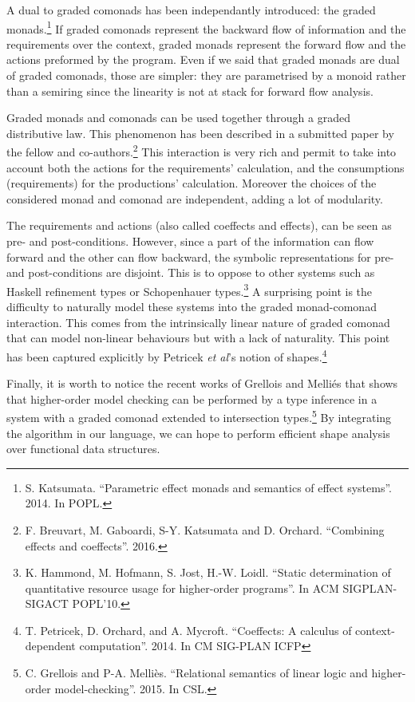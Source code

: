 \documentclass{article}[11pt]
\begin{document}
A dual to graded comonads has been independantly introduced: the graded monads.\footnote{S. Katsumata. ``Parametric effect monads and semantics of effect systems''. 2014. In POPL.} If graded comonads represent the backward flow of information and the requirements over the context, graded monads represent the forward flow and the actions preformed by the program. Even if we said that graded monads are dual of graded comonads, those are simpler: they are parametrised by a monoid rather than a semiring since the linearity is not at stack for forward flow analysis.

Graded monads and comonads can be used together through a graded distributive law. This phenomenon has been described in a submitted paper by the fellow and co-authors.\footnote{F. Breuvart, M. Gaboardi, S-Y. Katsumata and D. Orchard. ``Combining effects and coeffects''. 2016.} This interaction is very rich and permit to take into account both the actions for the requirements' calculation, and the consumptions (requirements) for the productions' calculation. Moreover the choices of the considered monad and comonad are independent, adding a lot of modularity.

The requirements and actions (also called coeffects and effects), can be seen as pre- and post-conditions. However, since a part of the information can flow forward and the other can flow backward, the symbolic representations for pre- and post-conditions are disjoint. This is to oppose to other systems such as Haskell refinement types or Schopenhauer types.\footnote{K. Hammond, M. Hofmann, S. Jost, H.-W. Loidl. ``Static determination of quantitative resource usage for higher-order programs''. In ACM SIGPLAN-SIGACT POPL’10.} A surprising point is the difficulty to naturally model these systems into the graded monad-comonad interaction. This comes from the intrinsically linear nature of graded comonad that can model non-linear behaviours but with a lack of naturality. This point has been captured explicitly by Petricek {\em et al}'s notion of shapes.\footnote{T. Petricek, D. Orchard, and A. Mycroft. ``Coeffects: A calculus of context-dependent computation''. 2014. In CM SIG-PLAN ICFP}

Finally, it is worth to notice the recent works of Grellois and Melli\'es that shows that higher-order model checking can be performed by a type inference in a system with a graded comonad extended to intersection types.\footnote{C. Grellois and P-A. Melli\`es. ``Relational semantics of linear logic and higher-order model-checking''. 2015. In CSL.} By integrating the algorithm in our language, we can hope to perform efficient shape analysis over functional data structures.
\end{document}
